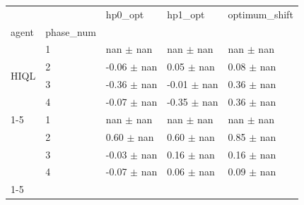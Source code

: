 \begin{tabular}{lllll}
\toprule
 &  & hp0_opt & hp1_opt & optimum_shift \\
agent & phase_num &  &  &  \\
\midrule
\multirow[t]{4}{*}{HIQL} & 1 & nan $\pm$ nan & nan $\pm$ nan & nan $\pm$ nan \\
 & 2 & -0.06 $\pm$ nan & 0.05 $\pm$ nan & 0.08 $\pm$ nan \\
 & 3 & -0.36 $\pm$ nan & -0.01 $\pm$ nan & 0.36 $\pm$ nan \\
 & 4 & -0.07 $\pm$ nan & -0.35 $\pm$ nan & 0.36 $\pm$ nan \\
\cline{1-5}
\multirow[t]{4}{*}{QRL} & 1 & nan $\pm$ nan & nan $\pm$ nan & nan $\pm$ nan \\
 & 2 & 0.60 $\pm$ nan & 0.60 $\pm$ nan & 0.85 $\pm$ nan \\
 & 3 & -0.03 $\pm$ nan & 0.16 $\pm$ nan & 0.16 $\pm$ nan \\
 & 4 & -0.07 $\pm$ nan & 0.06 $\pm$ nan & 0.09 $\pm$ nan \\
\cline{1-5}
\bottomrule
\end{tabular}
